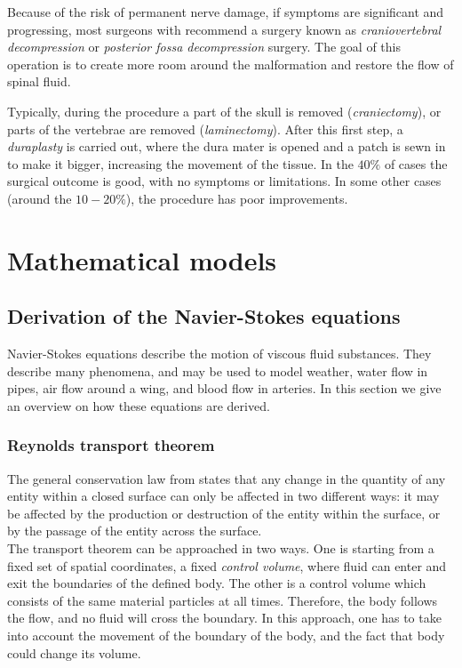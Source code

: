 \documentclass[a4paper,11pt,openright,twoside]{book}
\begin{document}
Because of the risk of permanent nerve damage, if symptoms are significant and progressing, most surgeons with recommend a surgery known as \emph{craniovertebral decompression} or \emph{posterior fossa decompression} surgery. The goal of this operation is to create more room around the malformation and restore the flow of spinal fluid. 

Typically, during the procedure a part of the skull is removed (\textit{craniectomy}), or parts of the vertebrae are removed (\textit{laminectomy}). After this first step, a \textit{duraplasty} is carried out, where the dura mater is opened and a patch is sewn in to make it bigger, increasing the movement of the tissue.
In the $40 \%$ of cases the surgical outcome is good, with no symptoms or limitations. In some other cases (around the $10-20 \%$), the procedure has poor improvements. 



\chapter{Mathematical models}

\section{Derivation of the Navier-Stokes equations}
Navier-Stokes equations describe the motion of viscous fluid substances. They describe many phenomena, and may be used to model weather, water flow in pipes, air flow around a wing, and blood flow in arteries. In this section we give an overview on how these equations are derived. 

\subsection{Reynolds transport theorem}
The general conservation law from \cite{reynolds} states that any change in the quantity of any entity within a closed surface can only be affected in two different ways: it may be affected by the production or destruction of the entity within the surface, or by the passage of the entity across the surface. \\
The transport theorem can be approached in two ways. One is starting from a fixed set of spatial coordinates, a fixed \emph{control volume}, where fluid can enter and exit the boundaries of the defined body. The other is a control volume which consists of the same material particles at all times. Therefore, the body follows the flow, and no fluid will cross the boundary. In this approach, one has to take into account the movement of the boundary of the body, and the fact that body could change its volume. 
\end{document}
